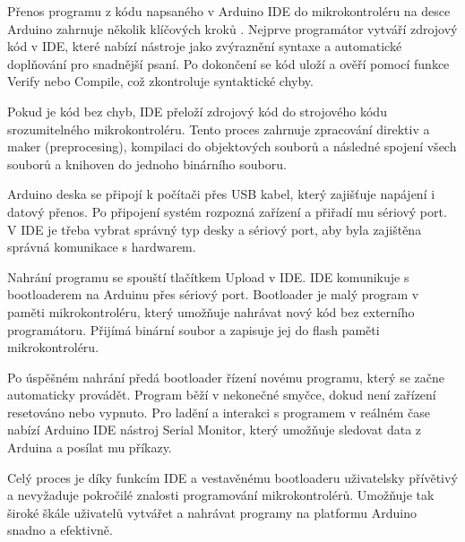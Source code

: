 Přenos programu z kódu napsaného v Arduino IDE do mikrokontroléru na desce Arduino zahrnuje několik klíčových kroků \cite{wire}.
Nejprve programátor vytváří zdrojový kód v IDE, které nabízí nástroje jako zvýraznění syntaxe a automatické doplňování pro snadnější psaní.
Po dokončení se kód uloží a ověří pomocí funkce Verify nebo Compile, což zkontroluje syntaktické chyby.

Pokud je kód bez chyb, IDE přeloží zdrojový kód do strojového kódu srozumitelného mikrokontroléru.
Tento proces zahrnuje zpracování direktiv a maker (preprocesing), kompilaci do objektových souborů a následné spojení všech souborů a knihoven do jednoho binárního souboru.

Arduino deska se připojí k počítači přes USB kabel, který zajišťuje napájení i datový přenos.
Po připojení systém rozpozná zařízení a přiřadí mu sériový port.
V IDE je třeba vybrat správný typ desky a sériový port, aby byla zajištěna správná komunikace s hardwarem.

Nahrání programu se spouští tlačítkem Upload v IDE. IDE komunikuje s bootloaderem na Arduinu přes sériový port.
Bootloader je malý program v paměti mikrokontroléru, který umožňuje nahrávat nový kód bez externího programátoru.
Přijímá binární soubor a zapisuje jej do flash paměti mikrokontroléru.

Po úspěšném nahrání předá bootloader řízení novému programu, který se začne automaticky provádět.
Program běží v nekonečné smyčce, dokud není zařízení resetováno nebo vypnuto.
Pro ladění a interakci s programem v reálném čase nabízí Arduino IDE nástroj Serial Monitor, který umožňuje sledovat data z Arduina a posílat mu příkazy.

Celý proces je díky funkcím IDE a vestavěnému bootloaderu uživatelsky přívětivý a nevyžaduje pokročilé znalosti programování mikrokontrolérů.
Umožňuje tak široké škále uživatelů vytvářet a nahrávat programy na platformu Arduino snadno a efektivně.



